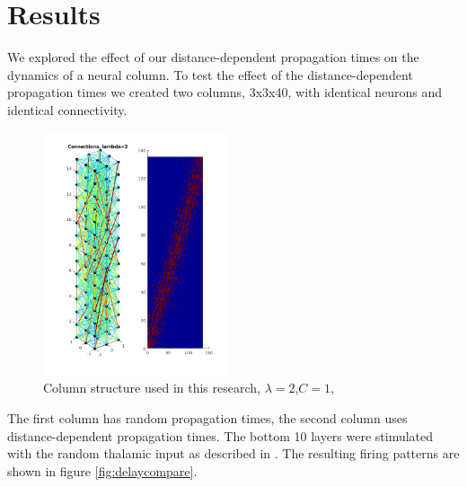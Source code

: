 \documentclass[a4paper,11pt]{article}
\begin{document}
\section{Results}
We explored the effect of our distance-dependent propagation times on the dynamics of a neural column.
To test the effect of the distance-dependent propagation times we created two columns, 3x3x40,  with identical neurons and identical connectivity. \\
\begin{figure}[ht]
 \caption{Column structure used in this research, $\lambda=2$,$C=1$,}
 \label{fig:column_structure}
 \centering
   \includegraphics[width=0.48\textwidth]{fig/lambda2}
\end{figure}
The first column has random propagation times, the second column uses distance-dependent propagation times.
The bottom 10 layers were stimulated with the random thalamic input as described in \cite{izhikevich2003}.
The resulting firing patterns are shown in figure \ref{fig:delaycompare}. \\
\end{document}
